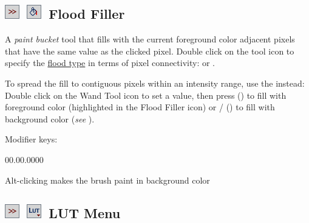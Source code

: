\subsection[Flood Filler]{\noindent \textsf{\protect\includegraphics[bb=0bp 5bp 20bp 20bp,scale=0.6]{images/tools/Switcher}}~\textsf{\protect\includegraphics[bb=0bp 5bp 20bp 20bp,scale=0.6]{images/tools/FloodFiller}}~Flood
Filler\label{sub:FloodFiller}\feature{}}

A \emph{paint
bucket }tool that fills with the current foreground color adjacent
pixels that have the same value as the clicked pixel. Double click
on the tool icon to specify the \href{http://en.wikipedia.org/wiki/Flood_fill}{flood type}
in terms of pixel connectivity:  or
.

To spread the fill to contiguous pixels within an intensity range,
use the  instead: Double click on the Wand
Tool icon to set a  value, then press
 ()
to fill with foreground color (highlighted in the Flood Filler icon)
or / ()
to fill with background color (\emph{see} ).

Modifier keys:
\begin{lyxlist}{00.00.0000}
\item [{\mykeystroke{Alt}}] \noindent Alt-clicking makes the brush paint
in background color
\end{lyxlist}



\subsection[LUT Menu]{\noindent \textsf{\protect\includegraphics[bb=0bp 5bp 20bp 20bp,scale=0.6]{images/tools/Switcher}}~\textsf{\protect\includegraphics[bb=0bp 5bp 20bp 20bp,scale=0.6]{images/tools/LUTMenu}}~LUT
Menu\label{sub:LUTMenu}\feature{}}

